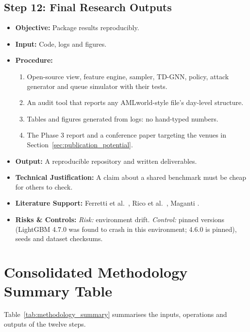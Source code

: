 \documentclass[11pt,a4paper]{article}
\begin{document}
\subsection{Step 12: Final Research Outputs}
\begin{itemize}[leftmargin=*]
    \item \textbf{Objective:} Package results reproducibly.
    \item \textbf{Input:} Code, logs and figures.
    \item \textbf{Procedure:}
    \begin{enumerate}[leftmargin=*]
        \item Open-source view, feature engine, sampler, TD-GNN, policy, attack generator and queue simulator with their tests.
        \item An audit tool that reports any AMLworld-style file's day-level structure.
        \item Tables and figures generated from logs: no hand-typed numbers.
        \item The Phase 3 report and a conference paper targeting the venues in Section~\ref{sec:publication_potential}.
    \end{enumerate}
    \item \textbf{Output:} A reproducible repository and written deliverables.
    \item \textbf{Technical Justification:} A claim about a shared benchmark must be cheap for others to check.
    \item \textbf{Literature Support:} Ferretti et al.\ \cite{ferretti2025aml}, Rico et al.\ \cite{rico2026taml}, Maganti \cite{maganti2026liability}.
    \item \textbf{Risks \& Controls:} \textit{Risk:} environment drift. \textit{Control:} pinned versions (LightGBM 4.7.0 was found to crash in this environment; 4.6.0 is pinned), seeds and dataset checksums.
\end{itemize}

\section{Consolidated Methodology Summary Table}
\label{sec:methodology_summary_table}

Table~\ref{tab:methodology_summary} summarises the inputs, operations and outputs of the twelve steps.
\end{document}
